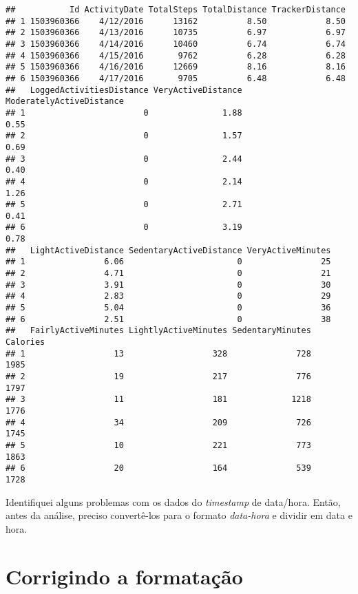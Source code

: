 \documentclass[
]{article}
\begin{document}
\begin{verbatim}
##           Id ActivityDate TotalSteps TotalDistance TrackerDistance
## 1 1503960366    4/12/2016      13162          8.50            8.50
## 2 1503960366    4/13/2016      10735          6.97            6.97
## 3 1503960366    4/14/2016      10460          6.74            6.74
## 4 1503960366    4/15/2016       9762          6.28            6.28
## 5 1503960366    4/16/2016      12669          8.16            8.16
## 6 1503960366    4/17/2016       9705          6.48            6.48
##   LoggedActivitiesDistance VeryActiveDistance ModeratelyActiveDistance
## 1                        0               1.88                     0.55
## 2                        0               1.57                     0.69
## 3                        0               2.44                     0.40
## 4                        0               2.14                     1.26
## 5                        0               2.71                     0.41
## 6                        0               3.19                     0.78
##   LightActiveDistance SedentaryActiveDistance VeryActiveMinutes
## 1                6.06                       0                25
## 2                4.71                       0                21
## 3                3.91                       0                30
## 4                2.83                       0                29
## 5                5.04                       0                36
## 6                2.51                       0                38
##   FairlyActiveMinutes LightlyActiveMinutes SedentaryMinutes Calories
## 1                  13                  328              728     1985
## 2                  19                  217              776     1797
## 3                  11                  181             1218     1776
## 4                  34                  209              726     1745
## 5                  10                  221              773     1863
## 6                  20                  164              539     1728
\end{verbatim}

Identifiquei alguns problemas com os dados do \emph{timestamp} de
data/hora. Então, antes da análise, preciso convertê-los para o formato
\emph{data-hora} e dividir em data e hora.

\hypertarget{corrigindo-a-formatauxe7uxe3o}{%
\section{Corrigindo a formatação}\label{corrigindo-a-formatauxe7uxe3o}}
\end{document}
